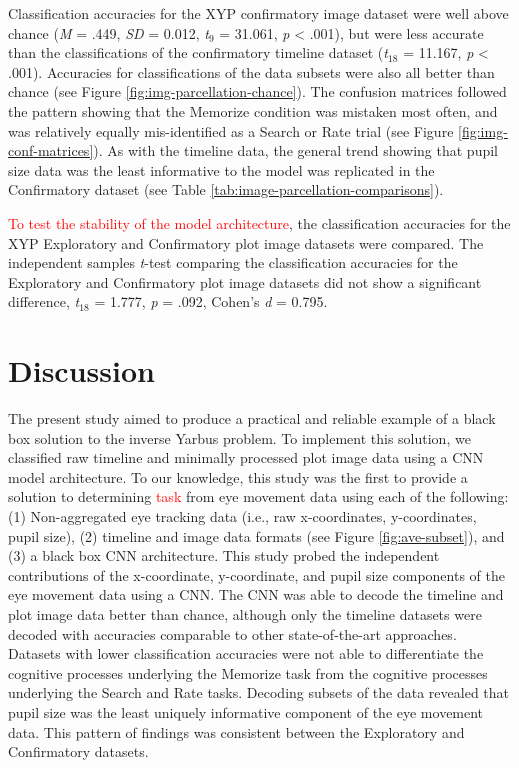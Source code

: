 \documentclass[
  english,
  man, donotrepeattitle,floatsintext]{apa6}
\begin{document}
Classification accuracies for the XYP confirmatory image dataset were well above chance (\emph{M} = .449, \emph{SD} = 0.012, \emph{t}\(_{9}\) = 31.061, \emph{p} \textless{} .001), but were less accurate than the classifications of the confirmatory timeline dataset (\emph{t}\(_{18}\) = 11.167, \emph{p} \textless{} .001). Accuracies for classifications of the data subsets were also all better than chance (see Figure \ref{fig:img-parcellation-chance}). The confusion matrices followed the pattern showing that the Memorize condition was mistaken most often, and was relatively equally mis-identified as a Search or Rate trial (see Figure \ref{fig:img-conf-matrices}). As with the timeline data, the general trend showing that pupil size data was the least informative to the model was replicated in the Confirmatory dataset (see Table \ref{tab:image-parcellation-comparisons}).

\textcolor{red}{To test the stability of the model architecture}, the classification accuracies for the XYP Exploratory and Confirmatory plot image datasets were compared. The independent samples \emph{t}-test comparing the classification accuracies for the Exploratory and Confirmatory plot image datasets did not show a significant difference, \emph{t}\(_{18}\) = 1.777, \emph{p} = .092, Cohen's \emph{d} = 0.795.

\section{Discussion}

The present study aimed to produce a practical and reliable example of a black box solution to the inverse Yarbus problem. To implement this solution, we classified raw timeline and minimally processed plot image data using a CNN model architecture. To our knowledge, this study was the first to provide a solution to determining \textcolor{red}{task} from eye movement data using each of the following: (1) Non-aggregated eye tracking data (i.e., raw x-coordinates, y-coordinates, pupil size), (2) timeline and image data formats (see Figure \ref{fig:ave-subset}), and (3) a black box CNN architecture. This study probed the independent contributions of the x-coordinate, y-coordinate, and pupil size components of the eye movement data using a CNN. The CNN was able to decode the timeline and plot image data better than chance, although only the timeline datasets were decoded with accuracies comparable to other state-of-the-art approaches. Datasets with lower classification accuracies were not able to differentiate the cognitive processes underlying the Memorize task from the cognitive processes underlying the Search and Rate tasks. Decoding subsets of the data revealed that pupil size was the least uniquely informative component of the eye movement data. This pattern of findings was consistent between the Exploratory and Confirmatory datasets.
\end{document}
